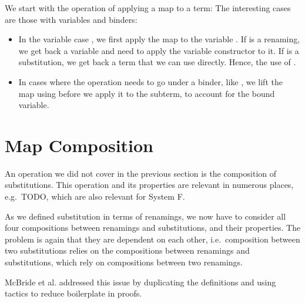 \documentclass[sigplan,10pt]{acmart}
\newenvironment{LibCode*}{%
  \begin{tcolorbox}[%
    colframe=white,%
    boxrule=0.0pt,%
    top=2.5pt,%
    left=2.5pt,%
    bottom=2.5pt,%
    right=2.5pt,%
    boxsep=0pt%
  ]\vspace{-0.2\baselineskip}%
}{%
  \vspace{-1\baselineskip}%
  \end{tcolorbox}%
}
\newenvironment{ExampleCode*}{%
  \begin{tcolorbox}[%
    colframe=white,%
    colback=yellow!5,%
    boxrule=0.0pt,%
    top=2.5pt,%
    left=2.5pt,%
    bottom=2.5pt,%
    right=2.5pt,%
    boxsep=0pt%
  ]\vspace{-0.2\baselineskip}%
}{%
  \vspace{-1\baselineskip}%
  \end{tcolorbox}%
}
\newcommand*\LibCode[1]{\begin{LibCode*}{#1}\end{LibCode*}}
\newcommand*\AppCode[1]{{#1}}
\newcommand*\ExampleCode[1]{\begin{ExampleCode*}{#1}\end{ExampleCode*}}
\newcommand*\ACode[1]{\AgdaFontStyle{\textcolor{mygray}{#1}}}
\newcommand*\AField[1]{\AgdaField{#1}}
\newcommand*\ACon[1]{\AgdaInductiveConstructor{#1}}
\newcommand*\ADef[1]{\AgdaFunction{#1}}
\begin{document}
  We start with the operation of applying a map to a term:
  \AppCode\FTraversalOp
  The interesting cases are those with variables and binders:
  \begin{itemize}
  \item 
    In the variable case \ACode{(\ACon{`} x) \ADef{⋯} ϕ}, we first apply the map
    \ACode{ϕ} to the variable \ACode{x}. If \ACode{ϕ} is a renaming,
    we get back a variable and need to apply the variable constructor
    \ACode{\ACon{`\_}} to it. If \ACode{ϕ} is a substitution,
    we get back a term that we can use directly.
    Hence, the use of \ACode{`/id}.
  \item 
    In cases where the operation needs to go under a binder, like
    \ACode{(\ACon{λx} e) \ADef{⋯} ϕ}, we lift the map using \AField{\_↑\_} before
    we apply it to the subterm, to account for the bound variable.
  \end{itemize}


  \AppCode\FTraversalId
  \AppCode\FTraversalIdProofInteresting
  \AppCode\FTraversal
  
  \ExampleCode\FExampleTrav




  \section{Map Composition}
  An operation we did not cover in the previous section is the
  composition of substitutions.
  This operation and its properties are relevant in numerous places, e.g.\
  TODO, which are also relevant for System F.

  As we defined substitution in terms of renamings, we now have to
  consider all four compositions between renamings and substitutions,
  and their properties. The problem is again that they are dependent
  on each other, i.e.\ composition between two substitutions relies on
  the compositions between renamings and substitutions, which rely on
  compositions between two renamings.

  McBride et al.\cite{DBLP:journals/jar/BentonHKM12} addressed this
  issue by duplicating the definitions and using tactics to reduce
  boilerplate in proofs.
\end{document}
